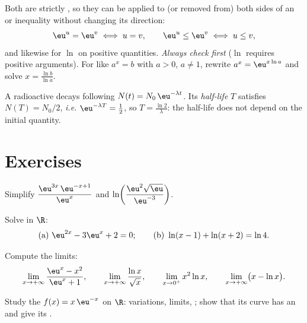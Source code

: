 \begin{method}\label{met:g12:exp:equations}
Both  are strictly , so they can be applied to (or removed
from) both sides of an  or inequality without changing its direction:
\[
\eu^{u} = \eu^{v} \iff u = v, \qquad
\eu^{u} \leq \eu^{v} \iff u \leq v,
\]
and likewise for $\ln$ on positive quantities. \emph{Always check 
first} ($\ln$ requires positive arguments). For  like
$a^x = b$ with $a>0$, $a \neq 1$, rewrite $a^x = \eu^{x\ln a}$ and solve
$x = \frac{\ln b}{\ln a}$.
\end{method}

\begin{example}\label{ex:g12:exp:halflife}
A radioactive  decays following $N(t) = N_0\,\eu^{-\lambda t}$. Its
\emph{half-life} $T$ satisfies $N(T) = N_0/2$, \emph{i.e.}
$\eu^{-\lambda T} = \frac12$, so $T = \frac{\ln 2}{\lambda}$: the half-life
does not depend on the initial quantity.
\end{example}

\section{Exercises}

\begin{exercise}[$\star$]\label{exo:g12:exp:1}
Simplify
$\dfrac{\eu^{3x}\,\eu^{-x+1}}{\eu^{x}}$ and
$\ln\!\left(\dfrac{\eu^2\sqrt{\eu}}{\eu^{-3}}\right)$.
\end{exercise}

\begin{exercise}[$\star$]\label{exo:g12:exp:2}
Solve in $\R$:
\[
\text{(a) } \eu^{2x} - 3\eu^{x} + 2 = 0;
\qquad
\text{(b) } \ln(x - 1) + \ln(x + 2) = \ln 4 .
\]
\end{exercise}

\begin{exercise}[$\star$]\label{exo:g12:exp:3}
Compute the limits:
\[
\lim_{x\to+\infty} \frac{\eu^x - x^2}{\eu^x + 1}, \qquad
\lim_{x\to+\infty} \frac{\ln x}{\sqrt x}, \qquad
\lim_{x\to0^+} x^2 \ln x, \qquad
\lim_{x\to+\infty} \bigl(x - \ln x\bigr).
\]
\end{exercise}

\begin{exercise}[$\star\star$]\label{exo:g12:exp:4}
Study the  $f(x) = x\,\eu^{-x}$ on $\R$: variations, limits,
; show that its curve has an  and give its
.
\end{exercise}

